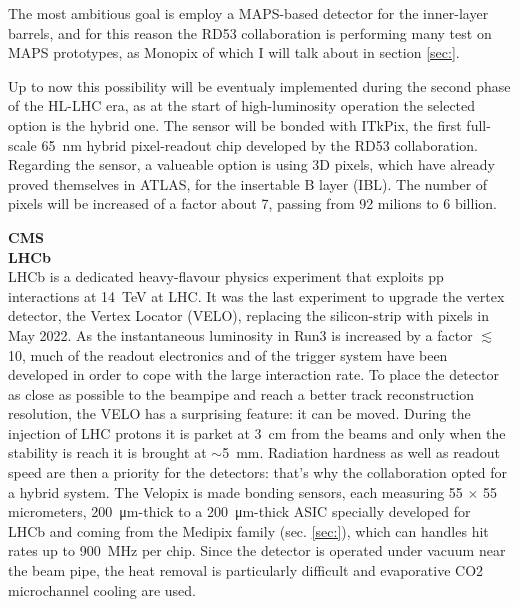         The most ambitious goal is employ a MAPS-based detector for the inner-layer barrels, and for this reason the RD53 collaboration is performing many test on MAPS prototypes, as Monopix of which I will talk about in section \ref{sec:}.
        
        Up to now this possibility will be eventualy implemented during the second phase of the HL-LHC era, as at the start of high-luminosity operation the selected option is the hybrid one. The sensor will be bonded with ITkPix, the first full-scale \SI{65}{nm} hybrid pixel-readout chip developed by the RD53 collaboration.
        Regarding the sensor, a valueable option is using 3D pixels, which have already proved themselves in ATLAS, for the insertable B layer (IBL).
        The number of pixels will be increased of a factor about 7, passing from 92 milions to 6 billion.
    
        \vspace{5mm}
        \textbf{CMS}\\

        \vspace{5mm}
        \textbf{LHCb} \\
        LHCb is a dedicated heavy-flavour physics experiment that exploits pp interactions at \SI{14}{TeV} at LHC. 
        It was the last experiment to upgrade the vertex detector, the Vertex Locator (VELO), replacing the silicon-strip with pixels in May 2022. 
        As the instantaneous luminosity in Run3 is increased by a factor $\lesssim$10, much of the readout electronics and of the trigger system have been developed in order to cope with the large interaction rate.
        To place the detector as close as possible to the beampipe and reach a better track reconstruction resolution, the VELO has a surprising feature: it can be moved. During the injection of LHC protons it is parket at \SI{3}{cm} from the beams and only when the stability is reach it is brought at $\sim$\SI{5}{mm}. Radiation hardness as well as readout speed are then a priority for the detectors: that's why the collaboration opted for a hybrid system. 
        The Velopix is made bonding sensors, each measuring 55 $\times$ 55 micrometers, \SI{200}{\um}-thick to a \SI{200}{\um}-thick ASIC specially developed for LHCb and coming from the Medipix family (sec. \ref{sec:}), which can handles hit rates up to \SI{900}{MHz} per chip.
        Since the detector is operated under vacuum near the beam pipe, the heat removal is particularly difficult and evaporative CO2 microchannel cooling are used. 

